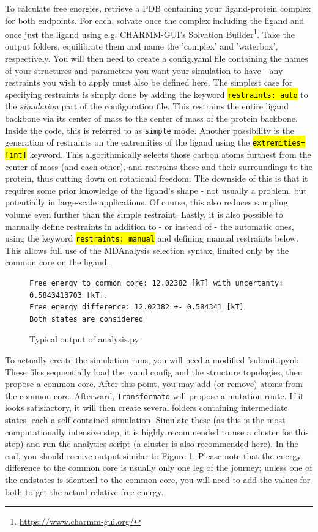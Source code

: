 \documentclass[oneside]{scrreprt}
\newcommand{\code}[1]{\texttt{\hl{#1}}}
\begin{document}
To calculate free energies, retrieve a PDB containing your ligand-protein complex for both endpoints. For each, solvate once the complex including the ligand and once just the ligand using e.g. CHARMM-GUI's Solvation Builder\footnote{\url{https://www.charmm-gui.org/}}. Take the output folders, equilibrate them and name the 'complex' and 'waterbox', respectively. You will then need to create a config.yaml file containing the names of your structures and parameters you want your simulation to have - any restraints you wish to apply must also be defined here. The simplest case for specifying restraints is simply done by adding the keyword \code{restraints: auto} to the \emph{simulation} part of the configuration file. This restrains the entire ligand backbone via its center of mass to the center of mass of the protein backbone. Inside the code, this is referred to as \texttt{simple} mode. Another possibility is the generation of restraints on the extremities of the ligand using the \code{extremities=[int]} keyword. This algorithmically selects those carbon atoms furthest from the center of mass (and each other), and restrains these and their surroundings to the protein, thus cutting down on rotational freedom. The downside of this is that it requires some prior knowledge of the ligand's shape - not usually a problem, but potentially in large-scale applications. Of course, this also reduces sampling volume even further than the simple restraint. Lastly, it is also possible to manually define restraints in addition to - or instead of - the automatic ones, using the keyword \code{restraints: manual} and defining manual restraints below. This allows full use of the MDAnalysis\cite{agrawal2011,oliver_beckstein-proc-scipy-2016} selection syntax, limited only by the common core on the ligand.

\begin{figure}\small

\begin{verbatim}
Free energy to common core: 12.02382 [kT] with uncertanty: 0.5843413703 [kT].
Free energy difference: 12.02382 +- 0.584341 [kT]
Both states are considered
\end{verbatim}
\label{fig:anaoutput}
\caption{Typical output of analysis.py}
\end{figure}

To actually create the simulation runs, you will need a modified 'submit.ipynb. These files sequentially load the .yaml config and the structure topologies, then propose a common core. After this point, you may add (or remove) atoms from the common core. Afterward, \texttt{Transformato} will propose a mutation route. If it looks satisfactory, it will then create several folders containing intermediate states, each a self-contained simulation. Simulate these (as this is the most computationally intensive step, it is highly recommended to use a cluster for this step) and run the analytics script (a cluster is also recommended here). In the end, you should receive output similar to Figure \ref{fig:anaoutput}. Please note that the energy difference to the common core is usually only one leg of the journey; unless one of the endstates is identical to the common core, you will need to add the values for both to get the actual relative free energy. 
\end{document}
